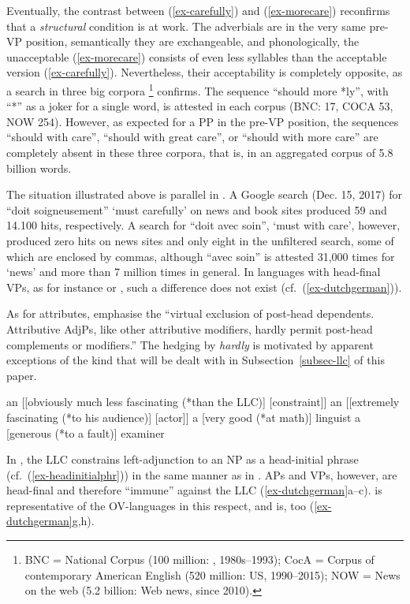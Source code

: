 \documentclass[output=paper
  ,nobabel
  ,uniformtopskip %
]{langscibook}
\begin{document}
\noindent
Eventually, the contrast between (\ref{ex-carefully}) and (\ref{ex-morecare}) reconfirms that a \emph{structural} condition is at work. The adverbials are in the very same pre-VP position, semantically they are exchangeable, and phonologically, the unacceptable (\ref{ex-morecare}) consists of even less syllables than the acceptable version (\ref{ex-carefully}). Nevertheless, their acceptability is completely opposite, as a search in three big corpora%
%
\footnote{BNC =  National Corpus (100 million: , 1980s--1993); CocA = Corpus of contemporary American English (520 million: US, 1990--2015); NOW = News on the web (5.2 billion: Web news, since 2010).}
confirms. The sequence ``should more *ly'', with ``*'' as a joker for a single word, is attested in each corpus (BNC: 17, COCA 53, NOW 254). However, as expected for a PP in the pre-VP position, the sequences ``should with care'', ``should with great care'', or ``should with more care'' are completely absent in these three corpora, that is, in an aggregated corpus of 5.8 billion words.

The situation illustrated above is parallel in . A Google search (Dec. 15, 2017) for ``doit soigneusement'' `must carefully' on news and book sites produced 59 and 14.100 hits, respectively. A search for ``doit avec soin'', `must with care', however, produced zero hits on news sites and only eight in the unfiltered search, some of which are enclosed by commas, although ``avec soin'' is attested 31,000 times for ‘news’ and more than 7 million times in general. In languages with head-final VPs, as for instance  or , such a difference does not exist (cf.\ (\ref{ex-dutchgerman})).

As for attributes, \citet*[551]{HuddlestonPullum2002} emphasise the ``virtual exclusion of post-head dependents. Attributive AdjPs, like other attributive modifiers, hardly permit post-head complements or modifiers.'' The hedging by \emph{hardly} is motivated by apparent exceptions of the kind that will be dealt with in Subsection~\ref{subsec-llc} of this paper.

\eal\label{ex-adjunct-np}
\ex an [[obviously much less fascinating (*than the LLC)] [constraint]]
\ex an [[extremely fascinating (*to his audience)] [actor]]
\ex a [very good (*at math)] linguist
\ex a [generous (*to a fault)] examiner
\zl

\noindent
In , the LLC constrains left-adjunction to an NP as a head-initial phrase (cf.\ (\ref{ex-headinitialphr})) in the same manner as in . APs and VPs, however, are head-final and therefore ``immune'' against the LLC (\ref{ex-dutchgerman}a--c).  is representative of the  OV-languages in this respect, and  is, too (\ref{ex-dutchgerman}g,h).
\end{document}
